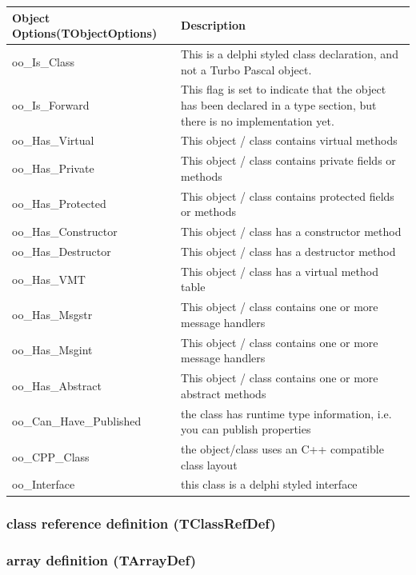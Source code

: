 \documentclass [a4paper,12pt]{article}
\begin{document}
\begin{longtable}{|l|p{10cm}|}
\hline
Object Options(TObjectOptions) & Description \\
\hline
\endhead
\hline
\endfoot
\textsf{oo{\_}Is{\_}Class}&
	This is a delphi styled class declaration, and not a Turbo Pascal
	object. \\
\textsf{oo{\_}Is{\_}Forward}&
	This flag is set to indicate that the object has been declared in a
	type section, but there is no implementation yet. \\
\textsf{oo{\_}Has{\_}Virtual}&
	This object / class contains virtual methods \\
\textsf{oo{\_}Has{\_}Private}&
	This object / class contains private fields or methods \\
\textsf{oo{\_}Has{\_}Protected}&
	This object / class contains protected fields or methods \\
\textsf{oo{\_}Has{\_}Constructor}&
	This object / class has a constructor method \\
\textsf{oo{\_}Has{\_}Destructor}&
	This object / class has a destructor method \\
\textsf{oo{\_}Has{\_}VMT}&
	This object / class has a virtual method table \\
\textsf{oo{\_}Has{\_}Msgstr}&
	This object / class contains one or more message handlers  \\
\textsf{oo{\_}Has{\_}Msgint}&
	This object / class contains one or more message handlers  \\
\textsf{oo{\_}Has{\_}Abstract}&
	This object / class contains one or more abstract methods \\
\textsf{oo{\_}Can{\_}Have{\_}Published}&
	the class has runtime type information, i.e. you can publish
	properties \\
\textsf{oo{\_}CPP{\_}Class}&
	the object/class uses an C++ compatible class layout \\
\textsf{oo{\_}Interface}&
	this class is a delphi styled interface
\end{longtable}

\subsubsection{class reference definition (TClassRefDef)}
\label{subsubsec:class}

\subsubsection{array definition (TArrayDef)}
\label{subsubsec:array}
\end{document}
